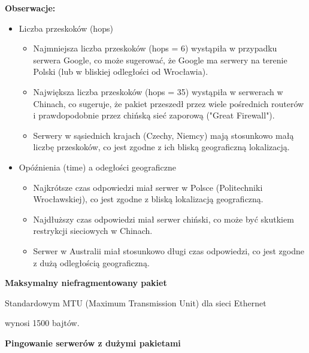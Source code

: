 \documentclass[12pt]{article}
\begin{document}
\vspace{5\baselineskip}

\textbf{Obserwacje: }

\vspace{1\baselineskip}
\begin{itemize}
  \item Liczba przeskoków (hops)
    \begin{itemize}
      \item Najmniejsza liczba przeskoków (hops = 6) wystąpiła w przypadku serwera Google, co może sugerować, że Google ma serwery na terenie Polski (lub w bliskiej odległości od Wrocławia).
      \item Największa liczba przeskoków (hops = 35) wystąpiła w serwerach w Chinach, co sugeruje, że pakiet przeszedł przez wiele pośrednich routerów i prawdopodobnie przez chińską sieć zaporową ("Great Firewall").
      \item Serwery w sąsiednich krajach (Czechy, Niemcy) mają stosunkowo małą liczbę przeskoków, co jest zgodne z ich bliską geograficzną lokalizacją.
    \end{itemize}

  \item Opóźnienia (time) a odegłości geograficzne
    \begin{itemize}
      \item Najkrótsze czas odpowiedzi miał serwer w Polsce (Politechniki Wrocławskiej), co jest zgodne z bliską lokalizacją geograficzną.
      \item Najdłuższy czas odpowiedzi miał serwer chiński, co może być skutkiem restrykcji sieciowych w Chinach.
      \item Serwer w Australii miał stosunkowo długi czas odpowiedzi, co jest zgodne z dużą odległością geograficzną.
    \end{itemize}
\end{itemize}

\vspace{1\baselineskip}

\textbf{Maksymalny niefragmentowany pakiet} \newline

Standardowym MTU (Maximum Transmission Unit) dla sieci Ethernet \par wynosi 1500 bajtów.

\vspace{1\baselineskip}
\textbf{Pingowanie serwerów z dużymi pakietami}
\end{document}

